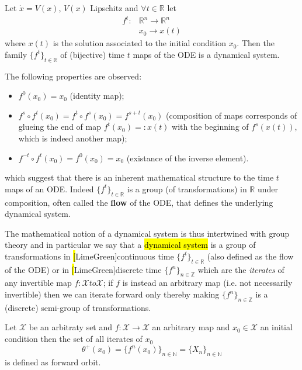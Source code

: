 \documentclass[../main.tex]{subfiles}
\begin{document}
   \begin{definition}\label{def4}
           Let $\dot{x}=V(x)$, $V(x)$ Lipschitz and $\forall t\in \mathbb{R}$ let
           \begin{align}\label{eq11}
                   f^{t}:& \mathbb{R}^{n}\to \mathbb{R}^{n} \nonumber \\
                         & x_{0}\to x(t)
           \end{align}
           where $x(t)$ is the solution associated to the initial condition $x_{0}$. Then the family $\{f^{t}\}_{t\in \mathbb{R}}$ of (bijective) time $t$ maps of the ODE is a dynamical system.
   \end{definition}
   \begin{observation}\label{obs1}
        The following properties are observed:
        \begin{itemize}
             \item $f^{0}(x_{0}) = x_{0}$ (identity map);
             \item $f^{s}\circ f^{t}(x_{0}) = f^{t}\circ f^{s}(x_{0}) = f^{s+t}(x_{0})$ (composition of maps corresponds of glueing the end of map $f^{t}(x_{0})=:x(t)$ with the beginning of $f^{s}(x(t))$, which is indeed another map);
             \item $f^{-t}\circ f^{t}(x_{0}) = f^{0}(x_{0}) = x_{0}$ (existance of the inverse element).
        \end{itemize}
        which suggest that there is an inherent mathematical structure to the time $t$ maps of an ODE. Indeed $\{f^{t}\}_{t\in \mathbb{R}}$ is a group (of transformations) in $\mathbb{R}$ under composition, often called the \textbf{flow} of the ODE, that defines the underlying dynamical system.
   \end{observation}
   The mathematical notion of a dynamical system is thus intertwined with group theory and in particular we say that a \hl{dynamical system} is a group of transformations in \hl[LimeGreen]{continuous time} $\{f^{t}\}_{t\in \mathbb{R}}$ (also defined as the flow of the ODE) or in \hl[LimeGreen]{discrete time} $\{f^{n}\}_{n\in \mathbb{Z}}$ which are the \textit{iterates} of any invertible map $f:\mathcal{X}to \mathcal{X}$; if $f$ is instead an arbitrary map (i.e. not necessarily invertible) then we can iterate forward only thereby making $\{f^{n}\}_{n\in \mathbb{Z}}$ is a (discrete) semi-group of transformations.
\begin{definition}\label{def5}
     Let $\mathcal{X}$ be an arbitraty set and $f:\mathcal{X}\to \mathcal{X}$ an arbitrary map and $x_{0}\in \mathcal{X}$ an initial condition then the set of all iterates of $x_{0}$
     \begin{equation}\label{eq11}
             \theta^{+}(x_{0}) = \{f^{n}(x_{0})\}_{n\in \mathbb{N}} = \{X_{n}\}_{n\in \mathbb{N}}
     \end{equation}
     is defined as forward orbit.
\end{definition}
\end{document}
